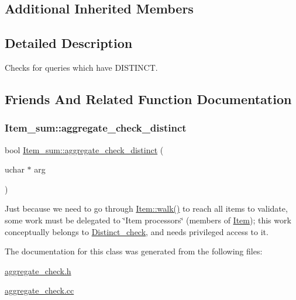 \subsection*{Additional Inherited Members}


\subsection{Detailed Description}
Checks for queries which have D\+I\+S\+T\+I\+N\+CT. 

\subsection{Friends And Related Function Documentation}
\mbox{\label{classDistinct__check_a428fcc2df9fde928311ae13c84f03bcc}} 
\subsubsection{\texorpdfstring{Item\+\_\+sum\+::aggregate\+\_\+check\+\_\+distinct}{Item\_sum::aggregate\_check\_distinct}}
{\footnotesize\ttfamily bool \mbox{\hyperlink{classItem__sum_a469f9e37bdb5f0c186b4fc2190f01fdb}{Item\+\_\+sum\+::aggregate\+\_\+check\+\_\+distinct}} (\begin{DoxyParamCaption}\item[{uchar $\ast$}]{arg }\end{DoxyParamCaption})\hspace{0.3cm}{\ttfamily [friend]}}

Just because we need to go through \mbox{\hyperlink{classItem_ab7d2529511c14a77e59a1b1bbabc95d7}{Item\+::walk()}} to reach all items to validate, some work must be delegated to \char`\"{}\+Item processors\char`\"{} (members of \mbox{\hyperlink{classItem}{Item}}); this work conceptually belongs to \mbox{\hyperlink{classDistinct__check}{Distinct\+\_\+check}}, and needs privileged access to it. 

The documentation for this class was generated from the following files\+:\begin{DoxyCompactItemize}
\item 
\mbox{\hyperlink{aggregate__check_8h}{aggregate\+\_\+check.\+h}}\item 
\mbox{\hyperlink{aggregate__check_8cc}{aggregate\+\_\+check.\+cc}}\end{DoxyCompactItemize}
